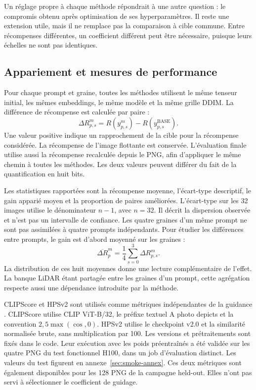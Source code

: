 \documentclass[11pt,a4paper]{article}
\begin{document}
Un réglage propre à chaque méthode répondrait à une autre question : le compromis obtenu après optimisation de ses hyperparamètres. Il reste une extension utile, mais il ne remplace pas la comparaison à cible commune. Entre récompenses différentes, un coefficient différent peut être nécessaire, puisque leurs échelles ne sont pas identiques.

\subsection{Appariement et mesures de performance}\label{sec:metrics}
Pour chaque prompt et graine, toutes les méthodes utilisent le même tenseur initial, les mêmes embeddings, le même modèle et la même grille DDIM. La différence de récompense est calculée par paire :
\begin{equation}
\Delta R_{p,s}^{m}=R(y_{p,s}^{m})-R(y_{p,s}^{\mathrm{BASE}}).
\end{equation}
Une valeur positive indique un rapprochement de la cible pour la récompense considérée. La récompense de l'image flottante est conservée. L'évaluation finale utilise aussi la récompense recalculée depuis le PNG, afin d'appliquer le même chemin à toutes les méthodes. Les deux valeurs peuvent différer du fait de la quantification en huit bits.

Les statistiques rapportées sont la récompense moyenne, l'écart-type descriptif, le gain apparié moyen et la proportion de paires améliorées. L'écart-type sur les 32 images utilise le dénominateur $n-1$, avec $n=32$. Il décrit la dispersion observée et n'est pas un intervalle de confiance. Les quatre graines d'un même prompt ne sont pas assimilées à quatre prompts indépendants. Pour étudier les différences entre prompts, le gain est d'abord moyenné sur les graines :
\begin{equation}
\overline{\Delta R}_p^{m}=\frac14\sum_{s=0}^{3}\Delta R_{p,s}^{m}.
\end{equation}
La distribution de ces huit moyennes donne une lecture complémentaire de l'effet. La banque LiDAR étant partagée entre les graines d'un prompt, cette agrégation respecte aussi une dépendance introduite par la méthode.

CLIPScore et HPSv2 sont utilisés comme métriques indépendantes de la guidance \cite{clipscore,hps}. CLIPScore utilise CLIP ViT-B/32, le préfixe textuel \og A photo depicts \fg{} et la convention $2{,}5\max(\cos,0)$. HPSv2 utilise le checkpoint v2.0 et la similarité normalisée brute, sans multiplication par 100. Les versions et prétraitements sont fixés dans le code. Leur exécution avec les poids préentraînés a été validée sur les quatre PNG du test fonctionnel H100, dans un job d'évaluation distinct. Les valeurs du test figurent en annexe~\ref{sec:smoke-annex}. Ces deux métriques sont également disponibles pour les 128 PNG de la campagne held-out. Elles n'ont pas servi à sélectionner le coefficient de guidage.
\end{document}
